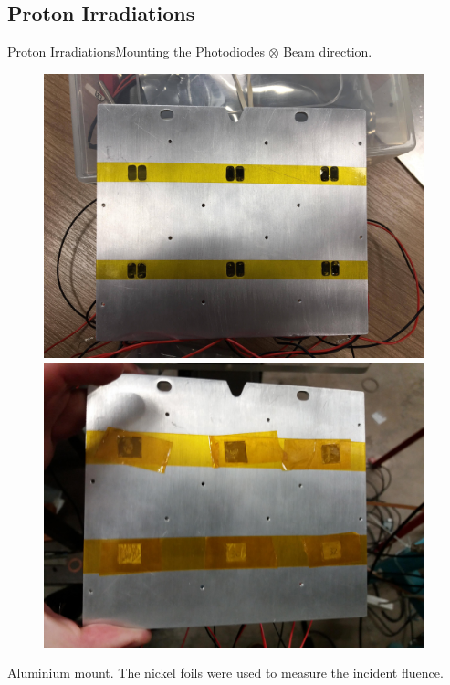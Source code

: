 \documentclass{beamer}
\begin{document}
\subsection{Proton Irradiations}

    \begin{frame}{Proton Irradiations}{Mounting the Photodiodes}
        \centering
        $\otimes$ Beam direction.
        \begin{figure}
            \begin{minipage}[b]{0.5\linewidth}
            \centering
            \includegraphics[width = 0.98\textwidth]{Mount_no_Foils.jpg}
        \end{minipage}%
        \begin{minipage}[b]{0.5\linewidth}
            \centering
            \includegraphics[width = 0.98\textwidth]{Mount_with_Foils.jpg}
        \end{minipage}
        \end{figure}
        \centering
        Aluminium mount. The nickel foils were used to measure the incident fluence.
    \end{frame}
        
\end{document}
